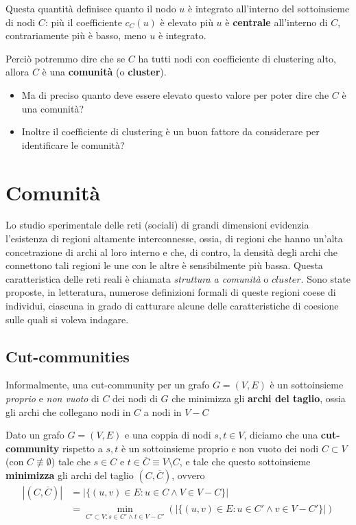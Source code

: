 Questa quantità definisce quanto il nodo $u$ è integrato all'interno del sottoinsieme di nodi $C$: più il coefficiente $c_C(u)$ è elevato più $u$ è \textbf{centrale} all'interno di $C$, contrariamente più è basso, meno $u$ è integrato.

Perciò potremmo dire che se $C$ ha tutti nodi con coefficiente di clustering alto, allora $C$ è una \textbf{comunità} (o \textbf{cluster}).

\begin{itemize}
    \item Ma di preciso quanto deve essere elevato questo valore per poter dire che $C$ è una comunità?
    \item  Inoltre il coefficiente di clustering è un buon fattore da considerare per identificare le comunità?
\end{itemize}

\section{Comunità}

Lo studio sperimentale delle reti (sociali) di grandi dimensioni evidenzia l'esistenza di regioni altamente interconnesse, ossia, di regioni che hanno un'alta concetrazione di archi al loro interno e che, di contro, la densità degli archi che connettono tali regioni le une con le altre è sensibilmente più bassa. Questa caratteristica delle reti reali è chiamata \textit{struttura a comunità} o $\textit{cluster}$. Sono state proposte, in letteratura, numerose definizioni formali di queste regioni coese di individui, ciascuna in grado di catturare alcune delle caratteristiche di coesione sulle quali si voleva indagare.

\subsection{Cut-communities}

Informalmente, una cut-community per un grafo $G = (V, E)$ è un sottoinsieme \textit{proprio} e \textit{non vuoto} di $C$ dei nodi di $G$ che minimizza gli \textbf{archi del taglio}, ossia gli archi che collegano nodi in $C$ a nodi in $V - C$

\begin{definizione}
    Dato un grafo $G = (V,E)$ e una coppia di nodi $s,t \in V$, diciamo che una \textbf{cut-community} rispetto a $s,t$ è un sottoinsieme proprio e non vuoto dei nodi $C \subset V$ (con $C \not\equiv \emptyset$) tale che $s \in C$ e $t \in \overline{C} \equiv V \setminus C$, e tale che questo sottoinsieme \textbf{minimizza} gli archi del taglio $(C,\overline{C})$, ovvero
    \begin{align*}
    |(C, \overline{C})| &= |\{(u, v) \in E: u \in C \land V \in V - C\}| \\ 
    &= \min_{C' \subset V: s \in C' \land t \in V - C'} (|\{(u,v) \in E: u \in C' \land v \in V - C'\}|)
    \end{align*}
\end{definizione}

